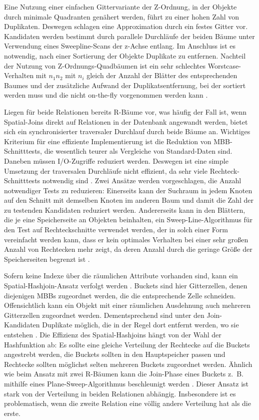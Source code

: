 \documentclass[a4paper,12pt,twoside]{article}
\begin{document}
{Eine Nutzung einer einfachen Gittervariante der Z-Ordnung, in der Objekte durch minimale Quadranten genähert werden, führt zu einer hohen Zahl von Duplikaten. Deswegen schlagen {\textcite[S. 280f]{Rigaux2001}} eine Approximation durch ein festes Gitter vor. Kandidaten werden bestimmt durch parallele Durchläufe der beiden Bäume unter Verwendung eines Sweepline-Scans der z-Achse entlang. Im Anschluss ist es notwendig, nach einer Sortierung der Objekte Duplikate zu entfernen. Nachteil der Nutzung von Z-Ordnungs-Quadbäumen ist ein sehr schlechtes Worstcase-Verhalten mit $n_1 n_2$ mit $n_i$ gleich der Anzahl der Blätter des entsprechenden Baumes und der zusätzliche Aufwand der Duplikatsentfernung, bei der sortiert werden muss und die nicht on-the-fly vorgenommen werden kann \parencite[S. 284]{Rigaux2001}. 

Liegen für beide Relationen bereits R-Bäume vor, was häufig der Fall ist, wenn Spatial-Joins direkt auf Relationen in der Datenbank angewandt werden, bietet sich ein synchronisierter traversaler Durchlauf durch beide Bäume an. Wichtiges Kriterium für eine effiziente Implementierung ist die Reduktion von MBB-Schnitttests, die wesentlich teurer als Vergleiche von Standard-Daten sind. Daneben müssen I/O-Zugriffe reduziert werden. Deswegen ist eine simple Umsetzung der traversalen Durchläufe nicht effizient, da sehr viele Rechteck-Schnitttests notwendig sind \parencite[S. 284f]{Rigaux2001}. Zwei Ansätze werden vorgeschlagen, die Anzahl notwendiger Tests zu reduzieren: Einerseits kann der Suchraum in jedem Knoten auf den Schnitt mit demselben Knoten im anderen Baum und damit die Zahl der zu testenden Kandidaten reduziert werden. Andererseits kann in den Blättern, die je eine Speicherseite an Objekten beinhalten, ein Sweep-Line-Algorithmus für den Test auf Rechteckschnitte verwendet werden, der in solch einer Form vereinfacht werden kann, dass er kein optimales Verhalten bei einer sehr großen Anzahl von Rechtecken mehr zeigt, da deren Anzahl durch die geringe Größe der Speicherseiten begrenzt ist \parencite[S. 286f]{Rigaux2001}. 

Sofern keine Indexe über die räumlichen Attribute vorhanden sind, kann ein Spatial-Hashjoin-Ansatz verfolgt werden \parencite[S. 288]{Rigaux2001}. Buckets sind hier Gitterzellen, denen diejenigen MBBs zugeordnet werden, die die entsprechende Zelle schneiden. Offensichtlich kann ein Objekt mit einer räumlichen Ausdehnung auch mehreren Gitterzellen zugeordnet werden. Dementsprechend sind unter den Join-Kandidaten Duplikate möglich, die in der Regel dort entfernt werden, wo sie entstehen \parencite{Zhou1998, Luo2002}. Die Effizienz des Spatial-Hashjoins hängt von der Wahl der Hashfunktion ab: Es sollte eine gleiche Verteilung der Rechtecke auf die Buckets angestrebt werden, die Buckets sollten in den Hauptspeicher passen und Rechtecke sollten möglichst selten mehreren Buckets zugeordnet werden. Ähnlich wie beim Ansatz mit zwei R-Bäumen kann die Join-Phase eines Buckets z.~B. mithilfe eines Plane-Sweep-Algorithmus beschleunigt werden \parencite[S. 290]{Rigaux2001}. Dieser Ansatz ist stark von der Verteilung in beiden Relationen abhängig. Insbesondere ist es problematisch, wenn die zweite Relation eine völlig andere Verteilung hat als die erste.

}
\end{document}
